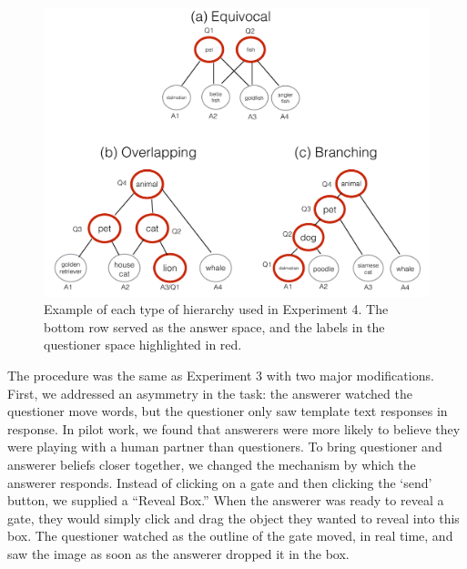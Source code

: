 \documentclass[12pt, floatsintext, man]{apa6}
\begin{document}
	\begin{figure}[t!]
\begin{center}
\includegraphics[scale = .3]{hierarchyStructureExamples}
\end{center}
\vspace{-.5cm}
\caption{Example of each type of hierarchy used in Experiment 4. The bottom row served as the answer space, and the labels in the questioner space highlighted in red. }
\vspace{-.1cm}
\label{fig:hierarchyStructures}
\end{figure}
The procedure was the same as Experiment 3 with two major modifications. First, we addressed an asymmetry in the task: the answerer watched the questioner move words, but the questioner only saw template text responses in response. In pilot work, we found that answerers were more likely to believe they were playing with a  human partner than questioners. To bring questioner and answerer beliefs closer together, we changed the mechanism by which the answerer responds. Instead of clicking on a gate and then clicking the `send' button, we supplied a ``Reveal Box.'' When the answerer was ready to reveal a gate, they would simply click and drag the object they wanted to reveal into this box. The questioner watched as the outline of the gate moved, in real time, and saw the image as soon as the answerer dropped it in the box. 
\end{document}
